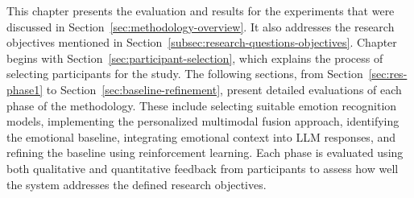 \par This chapter presents the evaluation and results for the experiments that were discussed in Section~\ref{sec:methodology-overview}. It also addresses the research objectives mentioned in Section~\ref{subsec:research-questions-objectives}. Chapter begins with Section~\ref{sec:participant-selection}, which explains the process of selecting participants for the study. The following sections, from Section~\ref{sec:res-phase1} to Section~\ref{sec:baseline-refinement}, present detailed evaluations of each phase of the methodology. These include selecting suitable emotion recognition models, implementing the personalized multimodal fusion approach, identifying the emotional baseline, integrating emotional context into LLM responses, and refining the baseline using reinforcement learning. Each phase is evaluated using both qualitative and quantitative feedback from participants to assess how well the system addresses the defined research objectives.










